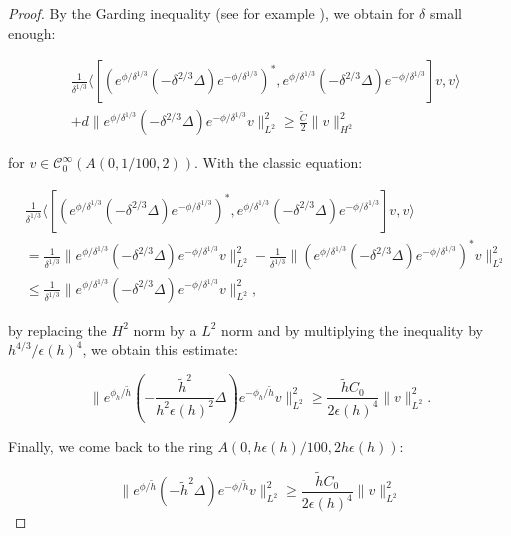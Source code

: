 \documentclass[leqno,11pt,letterpaper, english]{amsart}
\newcommand{\nn}{\nonumber}
\theoremstyle{plain}
\theoremstyle{definition}
\numberwithin{equation}{section}
\begin{document}
\begin{proof}
		By the Garding inequality (see for example \cite{alinhac2007pseudo}), we obtain for  $\delta$ small enough:
		
		\begin{align}
			&\frac{1}{\delta^{1/3}} \Biggl\langle \left[\left(e^{\phi/\delta^{1/3}}\left(-\delta^{2/3}\Delta\right)e^{-\phi/\delta^{1/3}}\right)^*,e^{\phi/\delta^{1/3}}\left(-\delta^{2/3}\Delta\right)e^{-\phi/\delta^{1/3}}   \right]v,v \Biggr\rangle \nn\\
			&+d\bigg\|e^{\phi/\delta^{1/3}}(-\delta^{2/3} \Delta)e^{-\phi/\delta^{1/3}}v\bigg\|_{L^2}^2\geq \frac{\tilde{C}}{2}\big\|v \big\|_{H^2}^2
		\end{align}
		
		for $v \in \mathcal{C}_0^{\infty}(A(0,1/100,2))$. With the classic equation:
		
		\begin{align}
			&\frac{1}{\delta^{1/3}} \Biggl\langle \left[\left(e^{\phi/\delta^{1/3}}\left(-\delta^{2/3}\Delta\right)e^{-\phi/\delta^{1/3}}\right)^*,e^{\phi/\delta^{1/3}}\left(-\delta^{2/3}\Delta\right)e^{-\phi/\delta^{1/3}}   \right]v,v \Biggr\rangle\nn\\
			&= \frac{1}{\delta^{1/3}}\Bigg\|e^{\phi/\delta^{1/3}}\left(-\delta^{2/3} \Delta\right)e^{-\phi/\delta^{1/3}}v\Bigg\|_{L^2}^2- \frac{1}{\delta^{1/3}}\Bigg\|\left(e^{\phi/\delta^{1/3}}\left(-\delta^{2/3} \Delta\right) e^{-\phi/\delta^{1/3}}\right)^*v\Bigg\|_{L^2}^2\nn\\
			&\leq \frac{1}{\delta^{1/3}}\Bigg\|e^{\phi/\delta^{1/3}}\left(-\delta^{2/3} \Delta\right)e^{-\phi/\delta^{1/3}}v\Bigg\|_{L^2}^2,			
		\end{align}
		
		 by replacing the $H^2$ norm by a $L^2$ norm and by multiplying the inequality by $h^{4/3}/\epsilon(h)^4$, we obtain this estimate:
		
		\begin{equation}
			\Big\|e^{\phi_h/\tilde{h}}(-\frac{\tilde{h}^2}{h^2\epsilon(h)^2} \Delta)e^{-\phi_h/\tilde{h}}v \Big\|_{L^2}^2\geq \frac{\tilde{h} C_0}{2\epsilon(h)^4}\big\|v \big\|_{L^2}^2.
		\end{equation}
		
		Finally, we come back to the ring $A(0,h\epsilon(h)/100,2h\epsilon(h))$:
		
		\begin{equation}
			\Big\| e^{\phi/\tilde{h}}(-\tilde{h}^2\Delta)e^{-\phi/\tilde{h}}v\Big\|_{L^2}^2\geq \frac{\tilde{h}C_0}{2\epsilon(h)^4}\big\|v \big\|_{L^2}^2
		\end{equation}
		

\end{proof}
\end{document}
